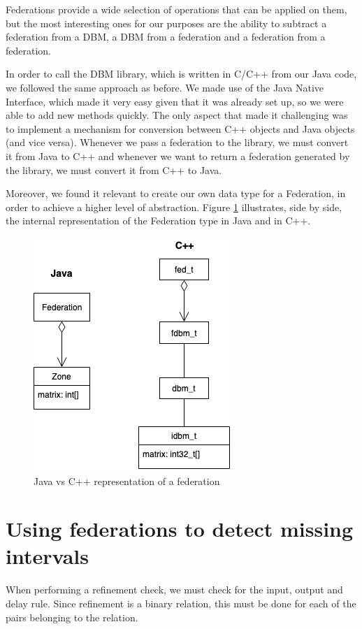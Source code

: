 Federations provide a wide selection of operations that can be applied on them, but the most interesting ones for our purposes are the ability to subtract a federation from a DBM, a DBM from a federation and a federation from a federation.

In order to call the DBM library, which is written in C/C++ from our Java code, we followed the same approach as before. We made use of the Java Native Interface, which made it very easy given that it was already set up, so we were able to add new methods quickly. The only aspect that made it challenging was to implement a mechanism for conversion between C++ objects and Java objects (and vice versa). Whenever we pass a federation to the library, we must convert it from Java to C++ and whenever we want to return a federation generated by the library, we must convert it from C++ to Java. 

Moreover, we found it relevant to create our own data type for a Federation, in order to achieve a higher level of abstraction. Figure \ref{fig:federation} illustrates, side by side, the internal representation of the Federation type in Java and in C++.

\begin{figure}
  \centering
  \includegraphics[scale=0.7]{figures/federation.png}
  \caption{Java vs C++ representation of a federation}
  \label{fig:federation}
\end{figure}

\section{Using federations to detect missing intervals}

When performing a refinement check, we must check for the input, output and delay rule. Since refinement is a binary relation, this must be done for each of the pairs belonging to the relation. 

